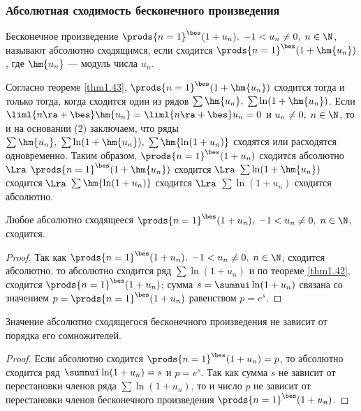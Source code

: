 \documentclass[a4paper]{article}
\begin{document}
\subsubsection{Абсолютная сходимость бесконечного произведения}
\begin{df}
Бесконечное произведение $\prods{n=1}^{\bes}(1+u_n), \; -1<u_n\ne0,
\; n\in\N$, называют абсолютно сходящимся, если сходится
$\prods{n=1}^{\bes}(1+\hm{u_n})$, где $\hm{u_n}$ --- модуль числа
$u_n$.
\end{df}

Согласно теореме \ref{thm1.43}, $\prods{n=1}^{\bes}(1+\hm{u_n})$
сходится тогда и только тогда, когда сходится один из рядов
$\sum\hm{u_n}, \; \sum\ln(1+\hm{u_n})$. Если
$\liml{n\ra+\bes}\hm{u_n} = \liml{n\ra+\bes}u_n=0$ и $u_n\ne0,\;
n\in\N$, то  и на основании (2) заключаем,
что ряды $\sum\hm{u_n}, \; \sum\ln(1+\hm{u_n}), \;
\sum\hm{\ln(1+u_n)}$ сходятся или расходятся одновременно. Таким
образом, $\prods{n=1}^{\bes}(1+u_n)$ сходится абсолютно $\Lra$
$\prods{n=1}^{\bes}(1+\hm{u_n})$ сходится $\Lra$
$\sum\ln(1+\hm{u_n})$ сходится $\Lra$ $\sum\hm{\ln(1+u_n)}$ сходится
$\Lra$ $\sum\ln(1+u_n)$ сходится абсолютно.

\begin{theorem}
Любое абсолютно сходящееся $\prods{n=1}^{\bes}(1+u_n), \;
-1<u_n\ne0, \; n\in\N$, сходится.
\end{theorem}

\begin{proof}
Так как $\prods{n=1}^{\bes}(1+u_n), \; -1<u_n\ne0, \; n\in\N$,
сходится абсолютно, то абсолютно сходится ряд $\sum\ln(1+u_n)$ и по
теореме \ref{thm1.42}, сходится $\prods{n=1}^{\bes}(1+u_n)$; сумма
$s=\sumnui\ln(1+u_n)$ связана со значением
$p=\prods{n=1}^{\bes}(1+u_n)$ равенством $p=e^s$.
\end{proof}

\begin{theorem}
Значение абсолютно сходящегося бесконечного произведения не зависит
от порядка его сомножителей.
\end{theorem}

\begin{proof}
Если абсолютно сходится $\prods{n=1}^{\bes}(1+u_n)=p$, то абсолютно
сходится ряд $\sumnui\ln(1+u_n) = s$ и $p=e^s$. Так как сумма $s$ не
зависит от перестановки членов ряда $\sum\ln(1+u_n)$, то и число $p$
не зависит от перестановки членов бесконечного произведения
$\prods{n=1}^{\bes}(1+u_n)$.
\end{proof}
\end{document}
